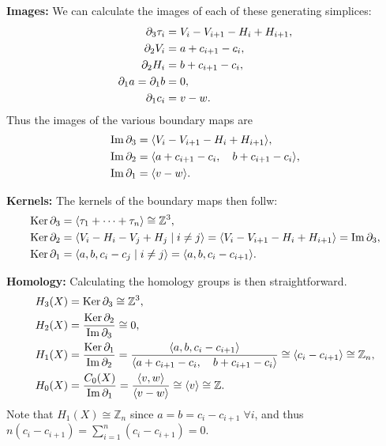 \documentclass[twoside,10pt]{article}
\begin{document}
\newpage

\textbf{Images:} We can calculate the images of each of these generating simplices:
\begin{align*}
	\partial_3 \tau_i &= V_i - V_{i+1} - H_i + H_{i+1},\\
	\partial_2 V_i &= a + c_{i+1}-c_i ,\\
	\partial_2 H_i &= b+c_{i+1}-c_i,\\
	\partial_1 a = \partial_1 b &= 0, \\
	\partial_1 c_i &= v-w.
\end{align*}
Thus the images of the various boundary maps are
\begin{align*}
	\operatorname{Im} \partial_3 &= \langle V_i - V_{i+1} - H_i + H_{i+1} \rangle,\\
	\operatorname{Im} \partial_2 &= \langle a + c_{i+1}-c_i, \quad b+c_{i+1}-c_i \rangle,\\
	\operatorname{Im} \partial_1 &= \langle v-w \rangle.
\end{align*}

\textbf{Kernels:} The kernels of the boundary maps then follw:
\begin{align*}
	\operatorname{Ker} \partial_3 &= \langle \tau_1 + \dots + \tau_n \rangle \cong \mathbb{Z}^{3},\\
	\operatorname{Ker} \partial_2 &= \langle V_i - H_i - V_j + H_j \;|\; i \neq j \rangle = \langle V_i - V_{i+1} - H_i + H_{i+1} \rangle=\operatorname{Im} \partial_3,\\
	\operatorname{Ker} \partial_1 &= \langle a,b,c_i-c_j \;|\; i \neq j \rangle = \langle a,b,c_i -c_{i+1} \rangle.
\end{align*}

\textbf{Homology:} Calculating the homology groups is then straightforward.
\begin{align*}
	H_3(X) &= \operatorname{Ker} \partial_3 \cong \mathbb{Z}^{3},\\
	H_2(X) &= \frac{\operatorname{Ker} \partial_2}{\operatorname{Im} \partial_3} \cong 0,\\
	H_1(X) &= \frac{\operatorname{Ker} \partial_1}{\operatorname{Im} \partial_2} = \frac{\langle a,b,c_i -c_{i+1} \rangle}{\langle a + c_{i+1}-c_i, \quad b+c_{i+1}-c_i \rangle} \cong \langle c_i - c_{i+1} \rangle\cong \mathbb{Z}_{n},\\
	H_0(X) &= \frac{C_0(X)}{\operatorname{Im} \partial_1} = \frac{\langle v,w \rangle}{\langle v-w \rangle} \cong \langle v \rangle\cong \mathbb{Z}.
\end{align*}
Note that $H_1(X) \cong \mathbb{Z}_{n}$ since $a=b=c_i-c_{i+1} \; \forall i$, and thus $n(c_i-c_{i+1}) = \sum_{i=1}^{n}(c_i-c_{i+1}) = 0$.
\end{document}
